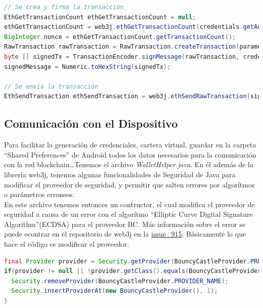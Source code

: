 \begin{lstlisting}[language=Java,float=ht,caption={[Java] Firmar y Enviar transacciones.},label=lst:transactionHelper]
// Se crea y firma la transacción
EthGetTransactionCount ethGetTransactionCount = null;
ethGetTransactionCount = web3j.ethGetTransactionCount(credentials.getAddress(), DefaultBlockParameterName.LATEST).send();
BigInteger nonce = ethGetTransactionCount.getTransactionCount();
RawTransaction rawTransaction = RawTransaction.createTransaction(parametrosJSON);
byte [] signedTx = TransactionEncoder.signMessage(rawTransaction, credentials)
signedMessage = Numeric.toHexString(signedTx);

// Se envia la transacción
EthSendTransaction ethSendTransaction = web3j.ethSendRawTransaction(signedMessage).send();
\end{lstlisting}


\subsection{Comunicación con el Dispositivo}

Para facilitar la generación de credenciales, cartera virtual, guardar en la carpeta ``Shared Preferences'' de Android todos los datos necesarios para la comunicación con la red blockchain\dots Tenemos el archivo \emph{WalletHelper.java}. En él además de la librería web3j, tenemos algunas funcionalidades de Seguridad de Java para modificar el proveedor de seguridad, y permitir que salten errores por algorítmos o parámetros erroneos. \\

En este archivo tenemos entonces un contructor, el cual modifica el proveedor de seguridad a causa de un error con el algorítmo ``Elliptic Curve Digital Signature Algorithm''(ECDSA)\cite{ecdsa} para el proveedor BC\cite{bc}. Más información sobre el error se puede econtrar en el repositorio de web3j en la \href{https://github.com/web3j/web3j/issues/915}{issue\_915}. Básicamente lo que hace el código es modificar el proveedor.

\begin{lstlisting}[language=Java,float=ht,caption={[Java] Modificación de proveedor de seguridad},label=lst:transactionHelper]
final Provider provider = Security.getProvider(BouncyCastleProvider.PROVIDER_NAME);
if(provider != null || !provider.getClass().equals(BouncyCastleProvider.class)){
  Security.removeProvider(BouncyCastleProvider.PROVIDER_NAME);
  Security.insertProviderAt(new BouncyCastleProvider(), 1);
}
\end{lstlisting}

